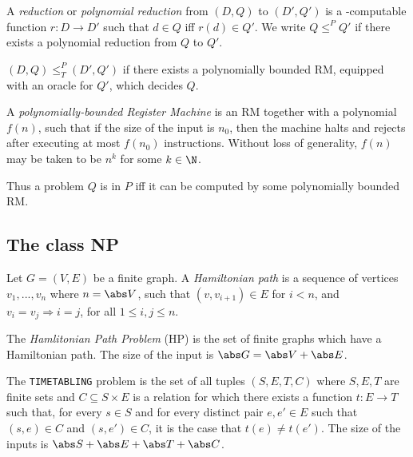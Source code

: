 \documentclass{article}
\begin{document}
\begin{definition}
    A \ptime \emph{reduction} or \emph{polynomial reduction} from $(D,Q)$ to $(D',Q')$ is 
    a \ptime-computable function $r:D\to D'$ such that $d\in Q$ iff $r(d)\in Q'$.
    We write $Q\leq^P Q'$ if there exists a polynomial reduction from $Q$ to $Q'$.
\end{definition}

\begin{definition}
    $(D,Q)\leq^P_T (D',Q')$ if there exists a polynomially bounded RM, equipped with an oracle 
    for $Q'$, which decides $Q$.
\end{definition}

\begin{definition}
    A \emph{polynomially-bounded Register Machine} is an RM together with a polynomial $f(n)$,
    such that if the size of the input is $n_0$, then the machine halts and rejects after 
    executing at most $f(n_0)$ instructions. Without loss of generality, $f(n)$ may be taken to be
    $n^k$ for some $k\in\N$.

    Thus a problem $Q$ is in $P$ iff it can be computed by some polynomially bounded RM.
\end{definition}

\subsection{The class NP}

\begin{definition}
    Let $G=(V,E)$ be a finite graph. A \emph{Hamiltonian path} is a sequence of vertices 
    $v_1,...,v_n$ where $n=\abs V$, such that $(v,v_{i+1})\in E$ for $i<n$, and $v_i=v_j 
    \Rightarrow i=j$, for all $1\leq i,j\leq n$.

    The \emph{Hamlitonian Path Problem} (HP) is the set of finite graphs which have a Hamiltonian
    path. The size of the input is $\abs G = \abs V + \abs E$.
\end{definition}

\begin{definition}
    The \texttt{TIMETABLING} problem is the set of all tuples $(S,E,T,C)$ where $S,E,T$ are finite 
    sets and $C\subseteq S\times E$ is a relation for which there exists a function $t:E\to T$
    such that, for every $s\in S$ and for every distinct pair $e,e'\in E$ such that $(s,e)\in C$
    and $(s,e')\in C$, it is the case that $t(e)\not=t(e')$. 
    The size of the inputs is $\abs S + \abs E + \abs T + \abs C$.
\end{definition}
\end{document}
